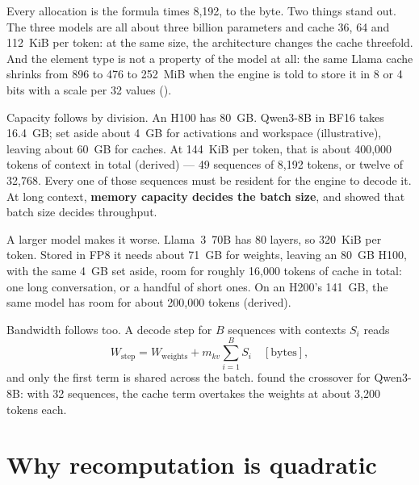 \noindent Every allocation is the formula times 8,192, to the byte. Two
things stand out. The three models are all about three billion parameters and
cache 36, 64 and 112~KiB per token: at the same size, the architecture changes
the cache threefold. And the element type is not a property of the model at
all: the same Llama cache shrinks from 896 to 476 to 252~MiB when the engine is
told to store it in 8 or 4 bits with a scale per 32 values
().


Capacity follows by division. An H100 has 80~GB. Qwen3-8B in BF16 takes
16.4~GB; set aside about 4~GB for activations and workspace (illustrative),
leaving about 60~GB for caches. At 144~KiB per token, that is about 400,000
tokens of context in total (derived) --- 49 sequences of 8,192 tokens, or
twelve of 32,768. Every one of those sequences must be resident for
the engine to decode it. At long context, \textbf{memory capacity decides the
batch size}, and  showed that batch size decides throughput.

A larger model makes it worse. Llama~3~70B has 80 layers, so 320~KiB per
token. Stored in FP8 it needs about 71~GB for weights, leaving an 80~GB H100,
with the same 4~GB set aside, room for roughly 16,000 tokens of cache in
total: one long conversation, or a handful of short ones. On an H200's
141~GB, the same model has room for about 200,000 tokens (derived).

Bandwidth follows too. A decode step for $B$ sequences with contexts $S_i$
reads
\begin{equation}
W_{\text{step}} = W_{\text{weights}} + m_{kv}\sum_{i=1}^{B} S_i
\quad[\text{bytes}],
\label{eq:decode-bytes}
\end{equation}
and only the first term is shared across the batch. 
found the crossover for Qwen3-8B: with 32 sequences, the cache term overtakes
the weights at about 3,200 tokens each.

\section{Why recomputation is quadratic}

